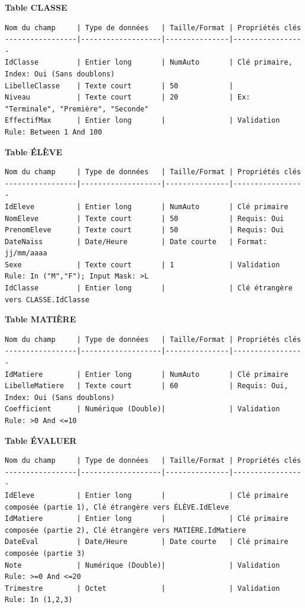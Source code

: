 \documentclass[11pt]{article}
\begin{document}
\begin{exemplebox}
\textbf{Table CLASSE}
\begin{lstlisting}
Nom du champ     | Type de données   | Taille/Format | Propriétés clés
-----------------|-------------------|---------------|-----------------
IdClasse         | Entier long       | NumAuto       | Clé primaire, Index: Oui (Sans doublons)
LibelleClasse    | Texte court       | 50            | 
Niveau           | Texte court       | 20            | Ex: "Terminale", "Première", "Seconde"
EffectifMax      | Entier long       |               | Validation Rule: Between 1 And 100
\end{lstlisting}

\textbf{Table ÉLÈVE}
\begin{lstlisting}
Nom du champ     | Type de données   | Taille/Format | Propriétés clés
-----------------|-------------------|---------------|-----------------
IdEleve          | Entier long       | NumAuto       | Clé primaire
NomEleve         | Texte court       | 50            | Requis: Oui
PrenomEleve      | Texte court       | 50            | Requis: Oui
DateNaiss        | Date/Heure        | Date courte   | Format: jj/mm/aaaa
Sexe             | Texte court       | 1             | Validation Rule: In ("M","F"); Input Mask: >L
IdClasse         | Entier long       |               | Clé étrangère vers CLASSE.IdClasse
\end{lstlisting}

\textbf{Table MATIÈRE}
\begin{lstlisting}
Nom du champ     | Type de données   | Taille/Format | Propriétés clés
-----------------|-------------------|---------------|-----------------
IdMatiere        | Entier long       | NumAuto       | Clé primaire
LibelleMatiere   | Texte court       | 60            | Requis: Oui, Index: Oui (Sans doublons)
Coefficient      | Numérique (Double)|               | Validation Rule: >0 And <=10
\end{lstlisting}

\textbf{Table ÉVALUER}
\begin{lstlisting}
Nom du champ     | Type de données   | Taille/Format | Propriétés clés
-----------------|-------------------|---------------|-----------------
IdEleve          | Entier long       |               | Clé primaire composée (partie 1), Clé étrangère vers ÉLÈVE.IdEleve
IdMatiere        | Entier long       |               | Clé primaire composée (partie 2), Clé étrangère vers MATIÈRE.IdMatiere
DateEval         | Date/Heure        | Date courte   | Clé primaire composée (partie 3)
Note             | Numérique (Double)|               | Validation Rule: >=0 And <=20
Trimestre        | Octet             |               | Validation Rule: In (1,2,3)
\end{lstlisting}
\end{exemplebox}
\end{document}
